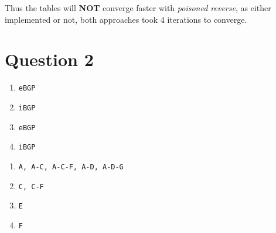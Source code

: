 \documentclass[12pt]{article}
\newcommand{\ilc}{\texttt}
\begin{document}
Thus the tables will \textbf{NOT} converge faster with \textit{poisoned reverse}, as either implemented or not, both approaches took 4 iterations to converge.

\section{Question 2}

\begin{enumerate}[label=(\alph*)]
    \item \ilc{eBGP}
    \item \ilc{iBGP}
    \item \ilc{eBGP}
    \item \ilc{iBGP}
\end{enumerate}

\smallskip

\begin{enumerate}[label=(\roman*)]
    \item \ilc{A, A-C, A-C-F, A-D, A-D-G}
    \item \ilc{C, C-F}
    \item \ilc{E}
    \item \ilc{F}
\end{enumerate}


%
% 
% 
\end{document}
